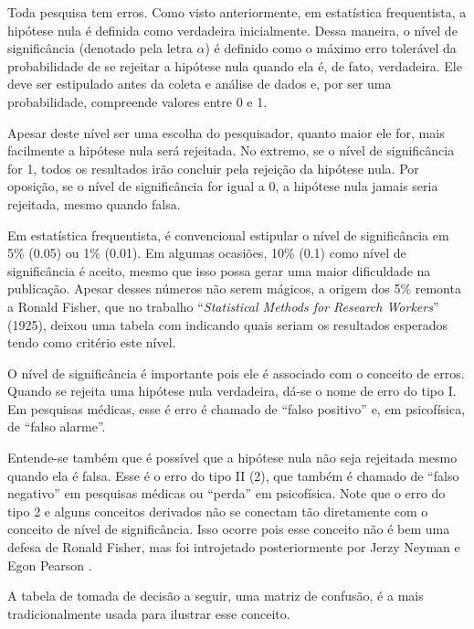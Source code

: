 \documentclass[
]{book}
\begin{document}
Toda pesquisa tem erros. Como visto anteriormente, em estatística frequentista, a hipótese nula é definida como verdadeira inicialmente. Dessa maneira, o nível de significância (denotado pela letra \(\alpha\)) é definido como o máximo erro tolerável \citep{Greenland2019} da probabilidade de se rejeitar a hipótese nula quando ela é, de fato, verdadeira. Ele deve ser estipulado antes da coleta e análise de dados e, por ser uma probabilidade, compreende valores entre 0 e 1.

Apesar deste nível ser uma escolha do pesquisador, quanto maior ele for, mais facilmente a hipótese nula será rejeitada. No extremo, se o nível de significância for 1, todos os resultados irão concluir pela rejeição da hipótese nula. Por oposição, se o nível de significância for igual a 0, a hipótese nula jamais seria rejeitada, mesmo quando falsa.

Em estatística frequentista, é convencional estipular o nível de significância em 5\% (0.05) ou 1\% (0.01). Em algumas ocasiões, 10\% (0.1) como nível de significância é aceito, mesmo que isso possa gerar uma maior dificuldade na publicação. Apesar desses números não serem mágicos, a origem dos 5\% remonta a Ronald Fisher, que no trabalho ``\emph{Statistical Methods for Research Workers}'' (1925), deixou uma tabela com indicando quais seriam os resultados esperados tendo como critério este nível.

O nível de significância é importante pois ele é associado com o conceito de erros. Quando se rejeita uma hipótese nula verdadeira, dá-se o nome de erro do tipo I. Em pesquisas médicas, esse é erro é chamado de ``falso positivo'' e, em psicofísica, de ``falso alarme''.

Entende-se também que é possível que a hipótese nula não seja rejeitada mesmo quando ela é falsa. Esse é o erro do tipo II (2), que também é chamado de ``falso negativo'' em pesquisas médicas ou ``perda'' em psicofísica. Note que o erro do tipo 2 e alguns conceitos derivados não se conectam tão diretamente com o conceito de nível de significância. Isso ocorre pois esse conceito não é bem uma defesa de Ronald Fisher, mas foi introjetado posteriormente por Jerzy Neyman e Egon Pearson \citep{cohen2013explaining}.

A tabela de tomada de decisão a seguir, uma matriz de confusão, é a mais tradicionalmente usada para ilustrar esse conceito.
\end{document}

